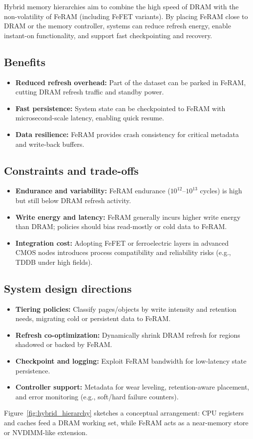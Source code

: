 Hybrid memory hierarchies aim to combine the high speed of DRAM with the non-volatility of FeRAM (including FeFET variants).  
By placing FeRAM close to DRAM or the memory controller, systems can reduce refresh energy, enable instant-on functionality, and support fast checkpointing and recovery.

\subsection*{Benefits}
\begin{itemize}
    \item \textbf{Reduced refresh overhead:} Part of the dataset can be parked in FeRAM, cutting DRAM refresh traffic and standby power.  
    \item \textbf{Fast persistence:} System state can be checkpointed to FeRAM with microsecond-scale latency, enabling quick resume.  
    \item \textbf{Data resilience:} FeRAM provides crash consistency for critical metadata and write-back buffers.  
\end{itemize}

\subsection*{Constraints and trade-offs}
\begin{itemize}
    \item \textbf{Endurance and variability:} FeRAM endurance ($10^{12}$–$10^{13}$ cycles) is high but still below DRAM refresh activity.  
    \item \textbf{Write energy and latency:} FeRAM generally incurs higher write energy than DRAM; policies should bias read-mostly or cold data to FeRAM.  
    \item \textbf{Integration cost:} Adopting FeFET or ferroelectric layers in advanced CMOS nodes introduces process compatibility and reliability risks (e.g., TDDB under high fields).  
\end{itemize}

\subsection*{System design directions}
\begin{itemize}
    \item \textbf{Tiering policies:} Classify pages/objects by write intensity and retention needs, migrating cold or persistent data to FeRAM.  
    \item \textbf{Refresh co-optimization:} Dynamically shrink DRAM refresh for regions shadowed or backed by FeRAM.  
    \item \textbf{Checkpoint and logging:} Exploit FeRAM bandwidth for low-latency state persistence.  
    \item \textbf{Controller support:} Metadata for wear leveling, retention-aware placement, and error monitoring (e.g., soft/hard failure counters).  
\end{itemize}

Figure~\ref{fig:hybrid_hierarchy} sketches a conceptual arrangement: CPU registers and caches feed a DRAM working set, while FeRAM acts as a near-memory store or NVDIMM-like extension.
